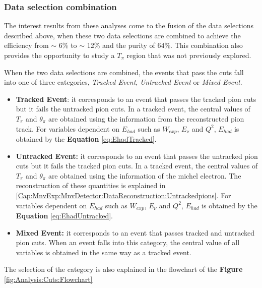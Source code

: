 \pagebreak

\subsubsection{Data selection combination}

The interest results from these analyses come to the fusion of the data selections described above, when these two data selections are combined to achieve the efficiency from \(\sim\) 6\% to \(\sim\) 12\% and the purity of 64\%. This combination also provides the opportunity to study a $T_\pi$ region that was not previously explored. 

When the two data selections are combined, the events that pass the cuts fall into one of three categories, \textit{Tracked Event}, \textit{Untracked Event} or \textit{Mixed Event}.
\begin{itemize}
    \item \textbf{Tracked Event}: it corresponds to an event that passes the tracked pion cuts but it fails the untracked pion cuts. In a tracked event, the central values of $T_\pi$ and $\theta_\pi$ are obtained using the information from the reconstructed pion track. For variables dependent on $E_{had}$ such as $W_{exp}$, $E_\nu$ and $Q^2$, $E_{had}$ is obtained by the \textbf{Equation} \ref{eq:EhadTracked}.
    \item \textbf{Untracked Event:} it corresponds to an event that passes the untracked pion cuts but it fails the tracked pion cuts. In a tracked event, the central values of $T_\pi$ and $\theta_\pi$ are obtained using the information of the michel electron. The reconstruction of these quantities is explained in \ref{Cap:MnvExp:MnvDetector:DataReconstruction:Untrackedpions}. For variables dependent on $E_{had}$ such as $W_{exp}$, $E_\nu$ and $Q^2$, $E_{had}$ is obtained by the \textbf{Equation} \ref{eq:EhadUntracked}.
    \item  \textbf{Mixed Event:} it corresponds to an event that passes tracked and untracked pion cuts. When an event falls into this category, the central value of all variables is obtained in the same way as a tracked event. 
\end{itemize}
The selection of the category is also explained in the flowchart of the \textbf{Figure} \ref{fig:Analysis:Cuts:Flowchart} 

